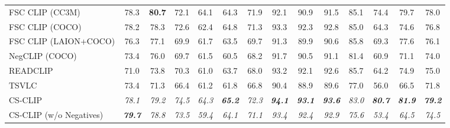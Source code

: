 \begin{table}[t]
\begin{adjustbox}{max width=\textwidth}
\begin{tabular}{p{5cm}cccccc|ccc|ccc|c}
    FSC CLIP (CC3M) & 78.3 & \textbf{80.7} & 72.1 & 64.1 & 64.3 & 71.9 & 92.1 & 90.9 & 91.5 & 85.1 & 74.4 & 79.7 & 78.0 \\
    FSC CLIP (COCO) & 78.2 & 78.3 & 72.6 & 62.4 & 64.8 & 71.3 & 93.3 & 92.3 & 92.8 & 85.0 & 64.3 & 74.6 & 76.8 \\
    FSC CLIP (LAION+COCO) & 76.3 & 77.1 & 69.9 & 61.7 & 63.5 & 69.7 & 91.3 & 89.9 & 90.6 & 85.8 & 69.3 & 77.6 & 76.1 \\
    NegCLIP (COCO) & 73.4 & 76.0 & 69.7 & 61.5 & 60.5 & 68.2 & 91.7 & 90.5 & 91.1 & 81.4 & 60.9 & 71.1 & 74.0 \\
    READCLIP & 71.0 & 73.8 & 70.3 & 61.0 & 63.7 & 68.0 & 93.2 & 92.1 & 92.6 & 85.7 & 64.2 & 74.9 & 75.0 \\
    TSVLC & 73.4 & 71.3 & 66.4 & 61.2 & 61.8 & 66.8 & 90.4 & 88.9 & 89.6 & 77.0 & 56.0 & 66.5 & 71.8 \\
    \midrule
    CS-CLIP & \emph{78.1} & \emph{79.2} & \emph{74.5} & \emph{64.3} & \emph{\textbf{65.2}} & \emph{72.3} & \emph{\textbf{94.1}} & \emph{\textbf{93.1}} & \emph{\textbf{93.6}} & \emph{83.0} & \emph{\textbf{80.7}} & \emph{\textbf{81.9}} & \emph{\textbf{79.2}} \\
    CS-CLIP (w/o Negatives) & \emph{\textbf{79.7}} & \emph{78.8} & \emph{73.5} & \emph{59.4} & \emph{64.1} & \emph{71.1} & \emph{93.4} & \emph{92.4} & \emph{92.9} & \emph{75.6} & \emph{53.4} & \emph{64.5} & \emph{74.5} \\
    \bottomrule
  \end{tabular}
  \end{adjustbox}
\end{table}